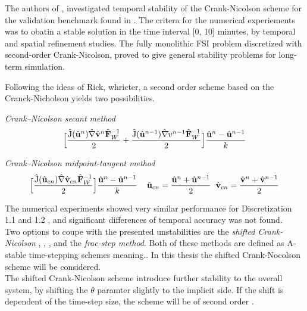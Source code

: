 The authors of \cite{Richter2015}, investigated temporal stability of the Crank-Nicolson scheme for the validation benchmark found in \cite{Hron2006}.  
The critera for the numerical experiements was to obatin a stable solution in the time interval [0, 10] minutes, by temporal and spatial refinement studies. The fully monolithic FSI problem discretized with second-order Crank-Nicolson, proved to give general stability problems for long-term simulation. 

Following the ideas of Rick, whricter, a second order scheme based on the Cranck-Nicholson yields two possibilities.
\begin{discr}
\textit{Crank–Nicolson secant method }
\begin{align*}
\Big[\frac{\text{\^{J}}(\hat{\mathbf{u}}^{n}) \hat{\mathbf{\nabla}} \hat{\mathbf{v}}^{n} \hat{\mathbf{F}}_W^{-1}}{2} 
+ \frac{\text{\^{J}}(\hat{\mathbf{u}}^{n-1}) \hat{\mathbf{\nabla}} \hat{\mathbf{}}v^{n-1} \hat{\mathbf{F}}_W^{-1}}{2} \Big] 
\frac{\hat{\mathbf{u}}^{n} - \hat{\mathbf{u}}^{n-1}}{k}
\end{align*} 
\end{discr}

\begin{discr}
\textit{Crank–Nicolson midpoint-tangent method}
\begin{align*}
\Big[\frac{\text{\^{J}}(\hat{\mathbf{u}}_{cn}) \hat{\mathbf{\nabla}} \hat{\mathbf{v}}_{cn} \hat{\mathbf{F}}_W^{-1}}{2} \Big] 
\frac{\hat{\mathbf{u}}^{n} - \hat{\mathbf{u}}^{n-1}}{k} \hspace{4mm}
\hat{\mathbf{u}}_{cn} = \frac{\hat{\mathbf{u}}^{n} + \hat{\mathbf{u}}^{n-1}}{2} \hspace{2mm}
\hat{\mathbf{v}}_{cn} = \frac{\hat{\mathbf{v}}^{n} + \hat{\mathbf{v}}^{n-1}}{2}
\end{align*} 
\end{discr}

The numerical experiments showed very similar performance for Discretization 1.1 and 1.2 , and significant differences of temporal accuracy was not found. \\
Two options to coupe with the presented unstabilities are the \textit{shifted Crank-Nicolson} \cite{Richter2015}, \cite{Wicka}, \cite{Wick2013a},   and the \textit{frac-step method}. Both of these methods are defined as A-stable time-stepping schemes meaning..  In this thesis the shifted Crank-Nocolson scheme will be considered. \\
The shifted Crank-Nicolson scheme introduce further stability to the overall system, by shifting the $\theta$ paramter slightly to the implicit side. If the shift is dependent of the time-step size, the scheme will be of second order \cite{Richter2015}.




